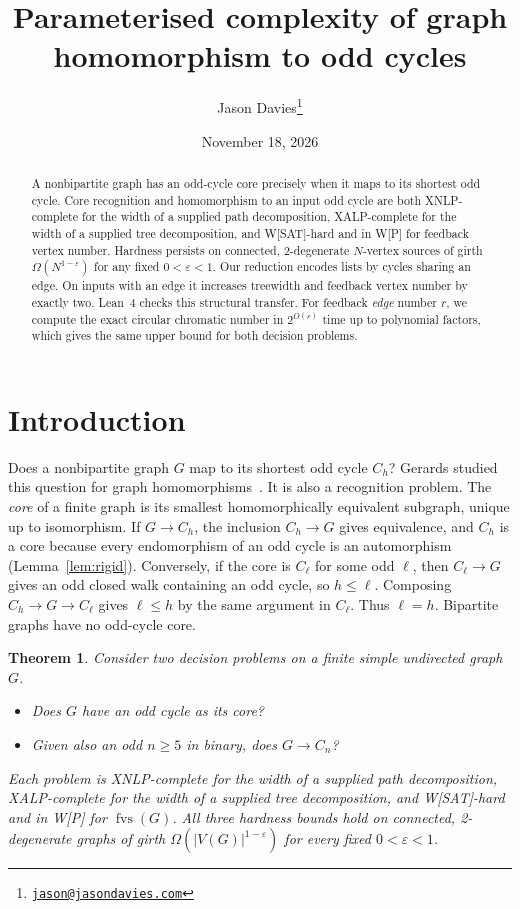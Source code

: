 \documentclass[11pt]{article}
\title{Parameterised complexity of graph homomorphism to odd cycles}
\author{Jason Davies\thanks{\href{mailto:jason@jasondavies.com}{\nolinkurl{jason@jasondavies.com}}}}
\date{November 18, 2026}
\newtheorem{theorem}{Theorem}
\theoremstyle{remark}
\DeclareMathOperator{\fvs}{fvs}
\begin{document}
\maketitle

\begin{abstract}
A nonbipartite graph has an odd-cycle core precisely when it maps to its
shortest odd cycle. Core recognition and homomorphism to an input odd
cycle are both XNLP-complete
for the width of a supplied path decomposition, XALP-complete for the
width of a supplied tree decomposition, and W[SAT]-hard and in W[P] for
feedback vertex number. Hardness persists on connected, 2-degenerate
$N$-vertex sources of girth $\Omega(N^{1-\varepsilon})$ for any fixed
$0<\varepsilon<1$.
Our reduction encodes lists by cycles sharing an edge. On inputs with an
edge it increases treewidth and feedback vertex number by exactly two.
Lean~4 checks this structural transfer.
For feedback \emph{edge} number $r$, we compute the exact circular
chromatic number in $2^{O(r)}$ time up to polynomial factors, which gives
the same upper bound for both decision problems.
\end{abstract}

\section{Introduction}
Does a nonbipartite graph $G$ map to its shortest odd cycle $C_h$?
Gerards studied this question for graph homomorphisms~\cite{gerards1988}.
It is also a recognition problem. The \emph{core} of a finite graph is its
smallest homomorphically equivalent subgraph, unique up to isomorphism.
If $G\to C_h$, the inclusion $C_h\to G$ gives equivalence, and $C_h$ is
a core because every endomorphism of an odd cycle is an automorphism
(Lemma~\ref{lem:rigid}). Conversely, if the core is $C_\ell$ for some
odd $\ell$, then $C_\ell\to G$ gives an odd closed walk containing an
odd cycle, so $h\leq\ell$. Composing $C_h\to G\to C_\ell$ gives
$\ell\leq h$ by the same argument in $C_\ell$. Thus $\ell=h$.
Bipartite graphs have no odd-cycle core.

\begin{theorem}\label{thm:main}
Consider two decision problems on a finite simple undirected graph $G$.
\begin{itemize}
\item Does $G$ have an odd cycle as its core?
\item Given also an odd $n\geq5$ in binary, does $G\to C_n$?
\end{itemize}
Each problem is XNLP-complete for the width of a supplied path decomposition,
XALP-complete for the width of a supplied tree decomposition, and
W[SAT]-hard and in W[P] for $\fvs(G)$. All three hardness bounds hold
on connected, 2-degenerate graphs of girth $\Omega(|V(G)|^{1-\varepsilon})$
for every fixed $0<\varepsilon<1$.
\end{theorem}
\end{document}
